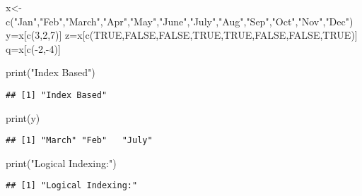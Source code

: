 \documentclass[
]{article}
\newenvironment{Shaded}{\begin{snugshade}}{\end{snugshade}}
\newcommand{\ConstantTok}[1]{\textcolor[rgb]{0.00,0.00,0.00}{#1}}
\newcommand{\DecValTok}[1]{\textcolor[rgb]{0.00,0.00,0.81}{#1}}
\newcommand{\FunctionTok}[1]{\textcolor[rgb]{0.00,0.00,0.00}{#1}}
\newcommand{\NormalTok}[1]{#1}
\newcommand{\OtherTok}[1]{\textcolor[rgb]{0.56,0.35,0.01}{#1}}
\newcommand{\SpecialCharTok}[1]{\textcolor[rgb]{0.00,0.00,0.00}{#1}}
\newcommand{\StringTok}[1]{\textcolor[rgb]{0.31,0.60,0.02}{#1}}
\begin{document}
\begin{Shaded}
\begin{Highlighting}[]
\NormalTok{x}\OtherTok{\textless{}{-}}\FunctionTok{c}\NormalTok{(}\StringTok{"Jan"}\NormalTok{,}\StringTok{"Feb"}\NormalTok{,}\StringTok{"March"}\NormalTok{,}\StringTok{"Apr"}\NormalTok{,}\StringTok{"May"}\NormalTok{,}\StringTok{"June"}\NormalTok{,}\StringTok{"July"}\NormalTok{,}\StringTok{"Aug"}\NormalTok{,}\StringTok{"Sep"}\NormalTok{,}\StringTok{"Oct"}\NormalTok{,}\StringTok{"Nov"}\NormalTok{,}\StringTok{"Dec"}\NormalTok{)}
\NormalTok{y}\OtherTok{=}\NormalTok{x[}\FunctionTok{c}\NormalTok{(}\DecValTok{3}\NormalTok{,}\DecValTok{2}\NormalTok{,}\DecValTok{7}\NormalTok{)]}
\NormalTok{z}\OtherTok{=}\NormalTok{x[}\FunctionTok{c}\NormalTok{(}\ConstantTok{TRUE}\NormalTok{,}\ConstantTok{FALSE}\NormalTok{,}\ConstantTok{FALSE}\NormalTok{,}\ConstantTok{TRUE}\NormalTok{,}\ConstantTok{TRUE}\NormalTok{,}\ConstantTok{FALSE}\NormalTok{,}\ConstantTok{FALSE}\NormalTok{,}\ConstantTok{TRUE}\NormalTok{)]}
\NormalTok{q}\OtherTok{=}\NormalTok{x[}\FunctionTok{c}\NormalTok{(}\SpecialCharTok{{-}}\DecValTok{2}\NormalTok{,}\SpecialCharTok{{-}}\DecValTok{4}\NormalTok{)]}

\FunctionTok{print}\NormalTok{(}\StringTok{"Index Based"}\NormalTok{)}
\end{Highlighting}
\end{Shaded}

\begin{verbatim}
## [1] "Index Based"
\end{verbatim}

\begin{Shaded}
\begin{Highlighting}[]
\FunctionTok{print}\NormalTok{(y)}
\end{Highlighting}
\end{Shaded}

\begin{verbatim}
## [1] "March" "Feb"   "July"
\end{verbatim}

\begin{Shaded}
\begin{Highlighting}[]
\FunctionTok{print}\NormalTok{(}\StringTok{"Logical Indexing:"}\NormalTok{)}
\end{Highlighting}
\end{Shaded}

\begin{verbatim}
## [1] "Logical Indexing:"
\end{verbatim}
\end{document}
